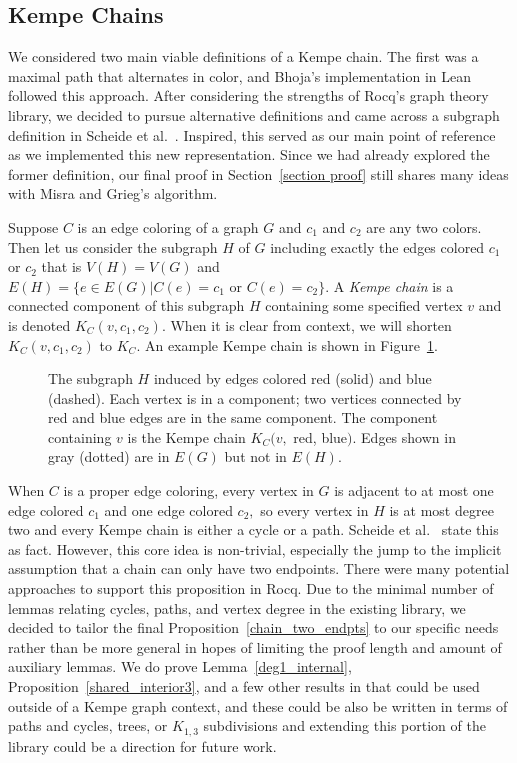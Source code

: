 \subsection{Kempe Chains}\label{section Kempe definition}
We considered two main viable definitions of a Kempe chain. The first was a maximal path that alternates in color, and Bhoja’s implementation in Lean followed this approach. After considering the strengths of Rocq’s graph theory library, we decided to pursue alternative definitions and came across a subgraph definition in Scheide et al.~\cite{GECBook}. Inspired, this served as our main point of reference as we implemented this new representation. Since we had already explored the former definition, our final proof in Section~\ref{section proof} still shares many ideas with Misra and Grieg's algorithm.

Suppose $C$ is an edge coloring of a graph $G$ and $c_1$ and $c_2$ are any two colors. Then let us consider the subgraph $H$ of $G$ including exactly the edges colored $c_1$ or $c_2$ that is $V(H) = V(G)$ and $E(H) = \{e\in E(G) | C(e) = c_1 \text{ or } C(e) = c_2\}.$ A \emph{Kempe chain} is a connected component of this subgraph $H$ containing some specified vertex $v$ and is denoted $K_C(v, c_1, c_2).$ When it is clear from context, we will shorten $K_C(v, c_1, c_2)$ to $K_C.$ An example Kempe chain is shown in Figure~\ref{fig:Kempe}.
\begin{figure}[h]
    \centering
    
    \caption{
    The subgraph $H$ induced by edges colored red (solid) and blue (dashed). Each vertex is in a component; two vertices connected by red and blue edges are in the same component. The component containing $v$ is the Kempe chain $K_C(v,$ red, blue$)$. Edges shown in gray (dotted) are in $E(G)$ but not in $E(H).$
    }
    \label{fig:Kempe}
\end{figure}
When $C$ is a proper edge coloring, every vertex in $G$ is adjacent to at most one edge colored $c_1$ and one edge colored $c_2,$ so every vertex in $H$ is at most degree two and every Kempe chain is either a cycle or a path. Scheide et al.~\cite{GECBook} state this as fact. However, this core idea is non-trivial, especially the jump to the implicit assumption that a chain can only have two endpoints. There were many potential approaches to support this proposition in Rocq. Due to the minimal number of lemmas relating cycles, paths, and vertex degree in the existing library, we decided to tailor the final Proposition~\ref{chain_two_endpts} to our specific needs rather than be more general in hopes of limiting the proof length and amount of auxiliary lemmas. We do prove Lemma~\ref{deg1_internal}, Proposition~\ref{shared_interior3}, and a few other results in  that could be used outside of a Kempe graph context, and these could be also be written in terms of paths and cycles, trees, or $K_{1,3}$ subdivisions and extending this portion of the library could be a direction for future work.

